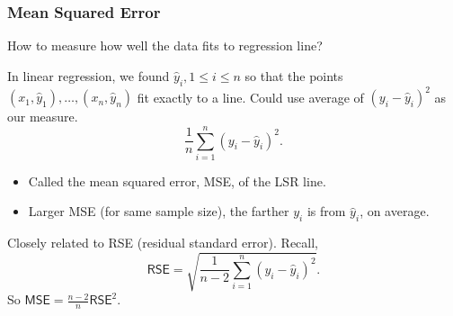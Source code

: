 \documentclass{beamer}
\theoremstyle{example}
\begin{document}
\begin{frame}
\frametitle{Mean Squared Error}
How to measure how well the data fits to regression line?

\pause 
In linear regression, we found $\hat{y}_i, 1\le i\le n$ so that the points $(x_1,\hat{y}_1), \ldots, (x_n, \hat{y}_n)$ fit exactly to a line. Could use average of $(y_i - \hat{y}_i)^2$ as our measure.
    \[ \frac{1}{n}\sum_{i=1}^n (y_i - \hat{y}_i)^2. \]
\pause
\begin{itemize}
    \item Called the mean squared error, MSE, of the LSR line.
    \item Larger MSE (for same sample size), the farther $y_i$ is from $\hat{y}_i$, on average.
\end{itemize}

\pause
Closely related to RSE (residual standard error). Recall, 
    \[\textsf{RSE} = \sqrt{\frac{1}{n-2}\sum_{i=1}^n(y_i - \hat{y}_i)^2}.\]
So $\textsf{MSE} = \frac{n-2}{n}\textsf{RSE}^2$.
\end{frame}
\end{document}
